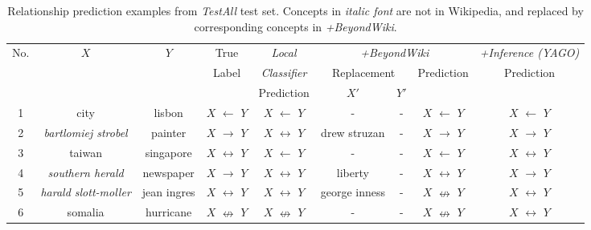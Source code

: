 \begin{table}[t]
  \begin{center}
    \begin{tabular}{|c|c|c|c|c|c|c|c|c|}
      \hline
      No.  &  $X$             &  $Y$          &  True     &  {\em Local}       &  \multicolumn{3}{|c|}{{\em +BeyondWiki}}             &  {\em +Inference (YAGO)}  \\ \cline{6-8}
      &                       &               &  Label    &  {\em Classifier}  &  \multicolumn{2}{|c|}{Replacement}           &  Prediction  &  Prediction         \\ \cline{6-7}
      &                       &               &           &  Prediction        &  $X'$                 & $Y'$  &              &                           \\
      \hline
      \hline
      1  &  city                 &  lisbon       &  $X$ $\leftarrow$ $Y$   &  $X$ $\leftarrow$ $Y$      &  -              &  -  &  $X$ $\leftarrow$ $Y$      &  $X$ $\leftarrow$ $Y$             \\
      2  &  {\em bartlomiej strobel}   &  painter  &  $X$ $\rightarrow$ $Y$  &  $X$ $\leftrightarrow$ $Y$  &  drew struzan   &  -  &  $X$ $\rightarrow$  $Y$      &  $X$ $\rightarrow$ $Y$             \\
      3  &  taiwan               &  singapore    &  $X$ $\leftrightarrow$ $Y$  &   $X$ $\leftarrow$  $Y$  &  -    &  -  &   $X$ $\leftarrow$  $Y$   &  $X$ $\leftrightarrow$ $Y$            \\
      4  &  {\em southern herald}      &  newspaper    &  $X$ $\rightarrow$  $Y$   &  $X$ $\leftrightarrow$ $Y$     &  liberty  &  -  &  $X$ $\leftrightarrow$ $Y$  &   $X$ $\rightarrow$ $Y$  \\
      5  &  {\em harald slott-moller}  &  jean ingres  &  $X$ $\leftrightarrow$ $Y$  &  $X$ $\leftrightarrow$ $Y$  &  george inness  &  -  & $X$ $\nleftrightarrow$ $Y$  &  $X$ $\leftrightarrow$ $Y$  \\
      6  &  somalia              &  hurricane    &  $X$ $\nleftrightarrow$ $Y$ &    $X$ $\nleftrightarrow$ $Y$    &  -  &  -  &    $X$ $\nleftrightarrow$ $Y$ &  $X$ $\leftrightarrow$ $Y$ \\
      \hline
    \end{tabular}
    \caption{Relationship prediction examples from {\em TestAll} test
      set. Concepts in {\em italic font} are not in Wikipedia, and
      replaced by corresponding concepts in {\em +BeyondWiki}.}
    \label{table:pre-examples}
  \end{center}
\end{table}

